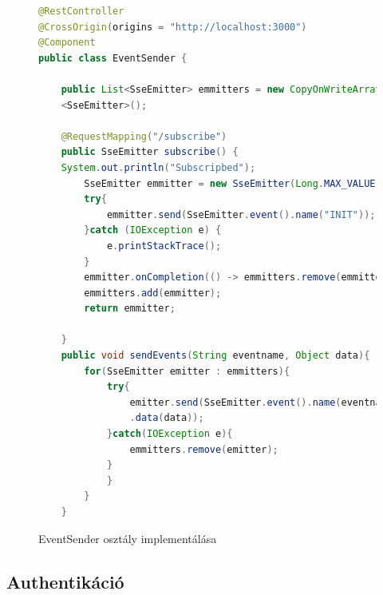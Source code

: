 \documentclass[a4paper,twoside]{article}
\begin{document}
\begin{figure}[h]
	\caption{EventSender osztály implementálása}
	\centering
	\begin{lstlisting}[language=java]	
@RestController
@CrossOrigin(origins = "http://localhost:3000")
@Component
public class EventSender {
		
	public List<SseEmitter> emmitters = new CopyOnWriteArrayList
	<SseEmitter>();
		
	@RequestMapping("/subscribe")
	public SseEmitter subscribe() {
	System.out.println("Subscripbed");
		SseEmitter emmitter = new SseEmitter(Long.MAX_VALUE);
		try{
			emmitter.send(SseEmitter.event().name("INIT"));
		}catch (IOException e) {
			e.printStackTrace();
		}
		emmitter.onCompletion(() -> emmitters.remove(emmitter));
		emmitters.add(emmitter);
		return emmitter;
		
	}
	public void sendEvents(String eventname, Object data){
		for(SseEmitter emitter : emmitters){
			try{
				emitter.send(SseEmitter.event().name(eventname)
				.data(data));
			}catch(IOException e){
				emmitters.remove(emitter);
			}
			}
		}
	}
	\end{lstlisting}
	\label{eventsender}
\end{figure} 



\subsection{Authentikáció}
\end{document}
